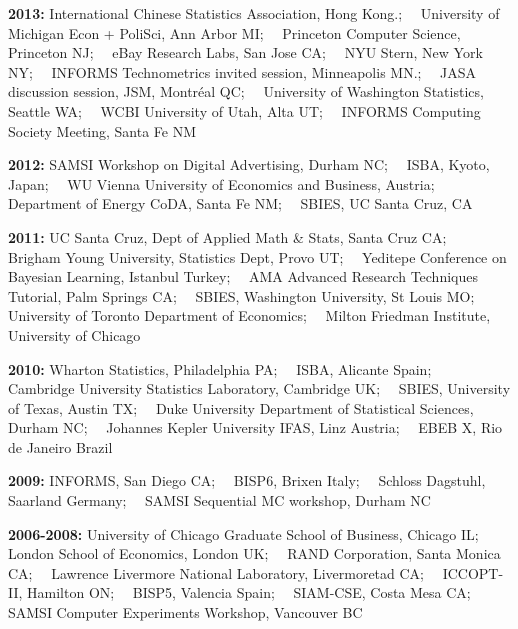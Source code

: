 \documentclass[margin,line]{res}
\begin{document}
\begin{resume}
{\bf 2013:} International Chinese Statistics Association, Hong Kong.;~~ University of Michigan Econ + PoliSci, Ann Arbor MI;~~ Princeton Computer Science, Princeton NJ;~~ eBay Research Labs, San Jose CA;~~ NYU Stern, New York NY;~~ INFORMS Technometrics invited session, Minneapolis MN.;~~ JASA discussion session, JSM, Montr\'eal QC;~~ University of Washington Statistics, Seattle WA;~~ WCBI University of Utah, Alta UT;~~ INFORMS Computing Society Meeting, Santa Fe NM


{\bf 2012:} SAMSI Workshop on Digital Advertising, Durham NC;~~ ISBA, Kyoto, Japan;~~ WU Vienna University of Economics and Business, Austria;~~ Department of Energy CoDA, Santa Fe NM;~~ SBIES, UC Santa Cruz, CA




{\bf 2011:} UC Santa Cruz, Dept of Applied Math \& Stats, Santa Cruz CA;~~ Brigham Young University, Statistics Dept, Provo UT;~~ Yeditepe Conference on Bayesian Learning, Istanbul Turkey;~~ AMA Advanced Research Techniques Tutorial,  Palm Springs CA;~~ SBIES, Washington University, St Louis MO;~~ University of Toronto Department of Economics;~~ Milton Friedman Institute, University of Chicago


{\bf 2010:} Wharton Statistics, Philadelphia PA;~~ ISBA, Alicante Spain;~~ Cambridge University Statistics Laboratory, Cambridge UK;~~ SBIES, University of Texas, Austin TX;~~ Duke University Department of Statistical Sciences, Durham NC;~~ Johannes Kepler University IFAS, Linz Austria;~~ EBEB X, Rio de Janeiro Brazil

{\bf 2009:} INFORMS, San Diego CA;~~ BISP6, Brixen Italy;~~ Schloss Dagstuhl, Saarland Germany;~~ SAMSI Sequential MC workshop, Durham NC


{\bf 2006-2008:} University of Chicago Graduate School of Business, Chicago IL;~~ London School of Economics, London UK;~~ RAND Corporation, Santa Monica CA;~~ Lawrence Livermore National Laboratory, Livermoretad CA;~~ ICCOPT-II, Hamilton ON;~~ BISP5, Valencia Spain;~~ SIAM-CSE, Costa Mesa CA;~~ SAMSI Computer Experiments Workshop, Vancouver BC




\end{resume}
\end{document}

